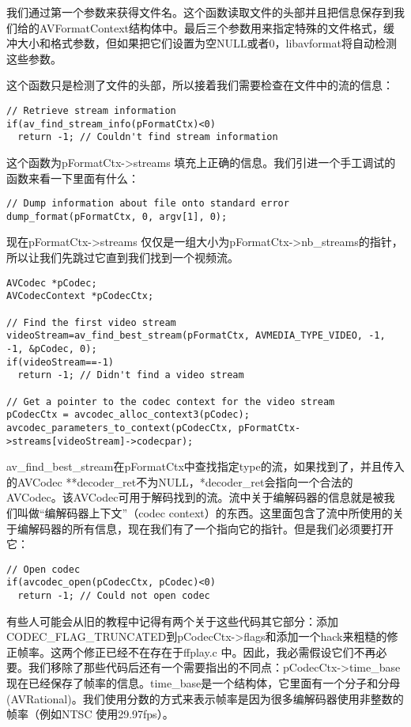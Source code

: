 我们通过第一个参数来获得文件名。这个函数读取文件的头部并且把信息保存到我们给的AVFormatContext结构体中。最后三个参数用来指定特殊的文件格式，缓冲大小和格式参数，但如果把它们设置为空NULL或者0，libavformat将自动检测这些参数。

这个函数只是检测了文件的头部，所以接着我们需要检查在文件中的流的信息：
\begin{lstlisting}
// Retrieve stream information
if(av_find_stream_info(pFormatCtx)<0)
  return -1; // Couldn't find stream information
\end{lstlisting}

这个函数为pFormatCtx->streams 填充上正确的信息。我们引进一个手工调试的
函数来看一下里面有什么：
\begin{lstlisting}
// Dump information about file onto standard error
dump_format(pFormatCtx, 0, argv[1], 0);
\end{lstlisting}

现在pFormatCtx->streams 仅仅是一组大小为pFormatCtx->nb_streams的指针，所以让我们先跳过它直到我们找到一个视频流。
\begin{lstlisting}
AVCodec *pCodec;
AVCodecContext *pCodecCtx;

// Find the first video stream
videoStream=av_find_best_stream(pFormatCtx, AVMEDIA_TYPE_VIDEO, -1, -1, &pCodec, 0);
if(videoStream==-1)
  return -1; // Didn't find a video stream

// Get a pointer to the codec context for the video stream
pCodecCtx = avcodec_alloc_context3(pCodec);
avcodec_parameters_to_context(pCodecCtx, pFormatCtx->streams[videoStream]->codecpar);
\end{lstlisting}

av_find_best_stream在pFormatCtx中查找指定type的流，如果找到了，并且传入的AVCodec **decoder_ret不为NULL，*decoder_ret会指向一个合法的AVCodec。该AVCodec可用于解码找到的流。流中关于编解码器的信息就是被我们叫做“编解码器上下文”（codec context）的东西。这里面包含了流中所使用的关于编解码器的所有信息，现在我们有了一个指向它的指针。但是我们必须要打开它：
\begin{lstlisting}
// Open codec
if(avcodec_open(pCodecCtx, pCodec)<0)
  return -1; // Could not open codec
\end{lstlisting}

有些人可能会从旧的教程中记得有两个关于这些代码其它部分：添加CODEC_FLAG_TRUNCATED到pCodecCtx->flags和添加一个hack来粗糙的修正帧率。这两个修正已经不在存在于ffplay.c 中。因此，我必需假设它们不再必要。我们移除了那些代码后还有一个需要指出的不同点：pCodecCtx->time_base 现在已经保存了帧率的信息。time_base是一个结构体，它里面有一个分子和分母(AVRational)。我们使用分数的方式来表示帧率是因为很多编解码器使用非整数的帧率（例如NTSC 使用29.97fps）。

